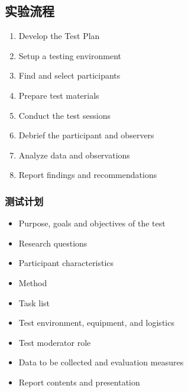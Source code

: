\documentclass[letterpaper,10pt,english]{sphinxmanual}
\begin{document}
\subsection{实验流程}
\label{\detokenize{content_test/usability_testing:id5}}\begin{enumerate}
%
\item {} 
\sphinxAtStartPar
Develop the Test Plan

\item {} 
\sphinxAtStartPar
Setup a testing environment

\item {} 
\sphinxAtStartPar
Find and select participants

\item {} 
\sphinxAtStartPar
Prepare test materials

\item {} 
\sphinxAtStartPar
Conduct the test sessions

\item {} 
\sphinxAtStartPar
Debrief the participant and observers

\item {} 
\sphinxAtStartPar
Analyze data and observations

\item {} 
\sphinxAtStartPar
Report findings and recommendations

\end{enumerate}


\subsubsection{测试计划}
\label{\detokenize{content_test/usability_testing:id6}}\begin{itemize}
\item {} 
\sphinxAtStartPar
Purpose, goals and objectives of the test

\item {} 
\sphinxAtStartPar
Research questions

\item {} 
\sphinxAtStartPar
Participant characteristics

\item {} 
\sphinxAtStartPar
Method

\item {} 
\sphinxAtStartPar
Task list

\item {} 
\sphinxAtStartPar
Test environment, equipment, and logistics

\item {} 
\sphinxAtStartPar
Test moderator role

\item {} 
\sphinxAtStartPar
Data to be collected and evaluation measures

\item {} 
\sphinxAtStartPar
Report contents and presentation

\end{itemize}
\end{document}
